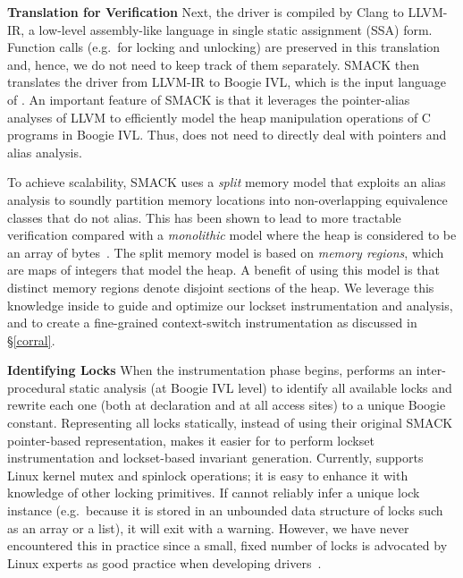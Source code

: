 \noindent\textbf{Translation for Verification }
%
Next, the driver is compiled by Clang to LLVM-IR, a low-level assembly-like language in single static assignment (SSA) form. Function calls (e.g.\ for locking and unlocking) are preserved in this translation and, hence, we do not need to keep track of them separately.
%
SMACK then translates the driver from LLVM-IR to Boogie IVL, which is the input language of \whoop. An important feature of SMACK is that it leverages the pointer-alias analyses of LLVM to efficiently model the heap manipulation operations of C programs in Boogie IVL. Thus, \whoop does not need to directly deal with pointers and alias analysis.

To achieve scalability, SMACK uses a \emph{split} memory model that exploits an alias analysis to soundly partition memory locations into non-overlapping equivalence classes that do not alias. This has been shown to lead to more tractable verification compared with a \emph{monolithic} model where the heap is considered to be an array of bytes~\cite{rakamaric2009scalable}. The split memory model is based on \emph{memory regions}, which are maps of integers that model the heap. A benefit of using this model is that distinct memory regions denote disjoint sections of the heap. We leverage this knowledge inside \whoop to guide and optimize our lockset instrumentation and analysis, and to create a fine-grained context-switch instrumentation as discussed in \S\ref{corral}.

\noindent\textbf{Identifying Locks }
%
When the instrumentation phase begins, \whoop performs an inter-procedural static analysis (at Boogie IVL level) to identify all available locks and rewrite each one (both at declaration and at all access sites) to a unique Boogie constant. Representing all locks statically, instead of using their original SMACK pointer-based representation, makes it easier for \whoop to perform lockset instrumentation and lockset-based invariant generation.
%
Currently, \whoop supports Linux kernel mutex and spinlock operations; it is easy to enhance it with knowledge of other locking primitives.
%
If \whoop cannot reliably infer a unique lock instance (e.g.\ because it is stored in an unbounded data structure of locks such as an array or a list), it will exit with a warning. However, we have never encountered this in practice since a small, fixed number of locks is advocated by Linux experts as good practice when developing drivers~\cite[p.\ 123]{corbet2005linux}.

